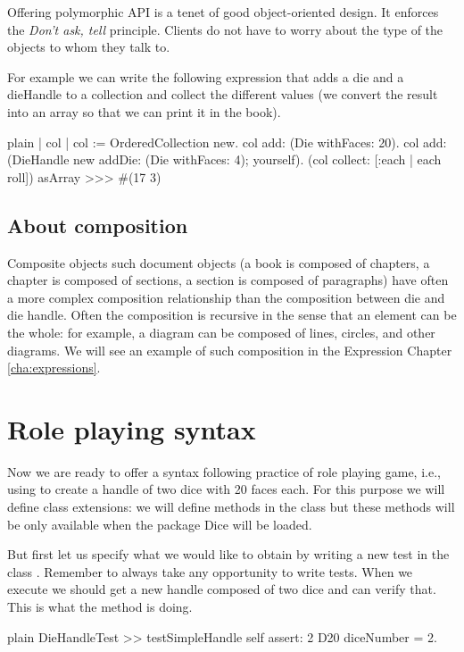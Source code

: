 \documentclass[10pt,twoside,english]{_support/latex/sbabook/sbabook}
\begin{document}
\begin{important}
Offering polymorphic API is a tenet of good object-oriented design. It enforces the \textit{Don't ask, tell} principle. Clients do not have to worry about the type of the objects to whom they talk to. 
\end{important}

For example we can write the following expression that adds a die and a dieHandle to a collection and collect the different values (we convert the result into an array so that we can print it in the book).

\begin{displaycode}{plain}
| col |
col := OrderedCollection new. 
col add: (Die withFaces: 20).
col add: (DieHandle new addDie: (Die withFaces: 4); yourself).
(col collect: [:each | each roll]) asArray
>>> #(17 3) 
\end{displaycode}
\subsection{About composition}
Composite objects such document objects (a book is composed of chapters, a chapter is composed of sections, a section is composed of paragraphs) have often a more complex composition relationship than the composition between die and die handle. Often the composition is recursive in the sense that an element can be the whole: for example, a diagram can be composed of lines, circles, and other diagrams. We will see an example of such composition in the Expression Chapter \ref{cha:expressions}.
\section{Role playing syntax}
Now we are ready to offer a syntax following practice of role playing game, i.e., using  to create a handle of two dice with 20 faces each.  For this purpose we will define class extensions: we will define methods in the class  but these methods will be only available when the package Dice will be loaded. 

But first let us specify  what we would like to obtain by writing a new  test in the class . Remember
to always take  any opportunity to write tests.  When we execute  we  should get a new handle  composed of two
dice and can verify that. This is what the method  is doing.

\begin{displaycode}{plain}
DieHandleTest >> testSimpleHandle
	self assert: 2 D20 diceNumber = 2.
\end{displaycode}
\end{document}
